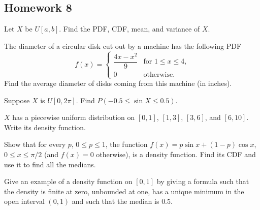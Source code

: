 \subsection{Homework 8}
\begin{problem}[Handout 12, \# 2]
  Let \(X\) be \(U[a,b]\). Find the PDF, CDF, mean, and variance of \(X\).
\end{problem}
\begin{solution*}
\end{solution*}

\begin{problem}[Handout 12, \# 8]
  The diameter of a circular disk cut out by a machine has the following
  PDF
  \[
    f(x)=%
    \begin{cases}
      \dfrac{4x-x^2}{9}&\text{for \(1\leq x\leq 4\),}\\
      0&\text{otherwise.}
    \end{cases}
  \]
  Find the average diameter of disks coming from this machine (in inches).
\end{problem}
\begin{solution*}
\end{solution*}

\begin{problem}[Handout 12, \# 9]
  Suppose \(X\) is \(U[0,2 \pi]\). Find \(P(-0.5\leq \sin X\leq 0.5)\).
\end{problem}
\begin{solution*}
\end{solution*}

\begin{problem}[Handout 12, \# 13]
  \(X\) has a piecewise uniform distribution on \([0,1]\), \([1,3]\),
  \([3,6]\), and \([6,10]\). Write its density function.
\end{problem}
\begin{solution*}
\end{solution*}

\begin{problem}[Handout 12, \# 16]
  Show that for every \(p\), \(0\leq p\leq 1\), the function
  \(f(x)=p\sin x+(1-p)\cos x\), \(0\leq x\leq\pi/2\) (and \(f(x)=0\)
  otherwise), is a density function. Find its CDF and use it to find all
  the medians.
\end{problem}
\begin{solution*}
\end{solution*}

\begin{problem}[Handout 12, \# 17]
  Give an example of a density function on \([0,1]\) by giving a formula
  such that the density is finite at zero, unbounded at one, has a unique
  minimum in the open interval \((0,1)\) and such that the median is
  \(0.5\).
\end{problem}
\begin{solution*}
\end{solution*}

